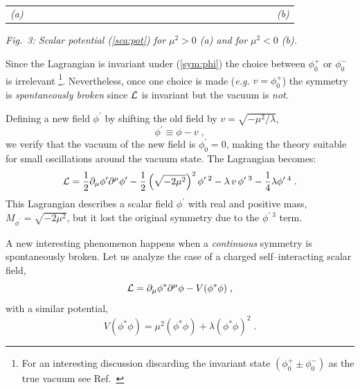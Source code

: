\documentclass[12pt]{report}
\newcommand{\lag}{{\cal L}}
\newcommand{\del}{\partial}
\begin{document}
\begin{figure}[ht]
\protect
\epsfxsize=12cm
\begin{center}
\mbox{} ~~~~~~~~~~~~~
\mbox{}
\end{center}
\end{figure}
\begin{center}
\vspace{-1cm}
\begin{tabular}{cc}
{\it (a)} ~~~~~~~~~~~~~~~~~~~~~~~~~~ & 
~~~~~~~~~~~~~~~~~~~~~~~ {\it (b)} \\
\end{tabular}
\end{center}
\begin{center}
\begin{minipage}[h]{12cm}
\begin{center}
{\it Fig.\ 3: Scalar potential (\ref{sca:pot}) for $\mu^2 > 0$ (a) and
for  $\mu^2 < 0$ (b).}
\end{center}
\end{minipage}
\end{center}

Since the Lagrangian is invariant under (\ref{sym:phi}) the choice
between $\phi_0^+$ or $\phi_0^-$ is irrelevant \footnote{For an 
interesting discussion discarding the invariant state $(\phi_0^+ \pm
\phi_0^-)$ as the true vacuum see Ref.\ \cite{Weinberg:96}}.
Nevertheless, once one choice is made ({\it e.g.} $v = \phi_0^+$) the
symmetry is {\it spontaneously broken} since $\lag$ is invariant but
the vacuum is {\it not}.

Defining a new field $\phi^\prime$ by shifting the old field by $v =
\sqrt{-\mu^2/\lambda}$, 
\[
\phi^\prime \equiv \phi - v \; ,
\]
we verify that the vacuum of the new field is $\phi^\prime_0 = 0$,
making the theory suitable for small oscillations around the vacuum
state. The Lagrangian becomes:
\[
\lag = \frac{1}{2} \del_\mu \phi^\prime \del^\mu \phi^\prime -
\frac{1}{2} \left( { \sqrt{-2 \mu^2}} \right)^2 \phi^{\prime \; 2} -
\lambda \, v \, \phi^{\prime \; 3} - \frac{1}{4} \lambda
\phi^{\prime \; 4} \; .
\]
This Lagrangian describes a scalar field $\phi^\prime$ with real and 
positive mass, $M_{\phi^\prime}=\sqrt{-2 \mu^2}$, but it lost the
original symmetry due to the $\phi^{\prime \; 3}$ term. 

A new interesting phenomenon happens when a {\it continuous}
symmetry is spontaneously broken. Let us analyze the case of  a
charged self--interacting scalar field,
\begin{equation}
\lag = \del_\mu \phi^\ast \del^\mu \phi -  V(\phi^\ast\phi) \; ,
\label{lag:com}
\end{equation}
with a similar potential,
\begin{equation}
V(\phi^\ast\phi) =  \mu^2 (\phi^\ast\phi) + \lambda (\phi^\ast\phi)^2
\; .
\label{pot:com}
\end{equation}
\end{document}
